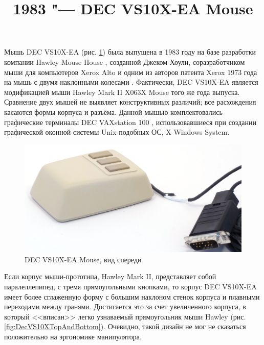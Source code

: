 \documentclass[11pt, a4paper]{article}
\begin{document}
\title{1983 "--- DEC VS10X-EA Mouse}
\date{}
\maketitle
{}
Мышь DEC VS10X-EA (рис. \ref{fig:DecVS10XPic}) была выпущена в 1983 году на базе разработки компании Hawley Mouse House \cite{hawley,mouses}, созданной Джеком Хоули, соразработчиком мыши для компьютеров Xerox Alto и одним из авторов патента Xerox 1973 года на мышь с двумя наклонными колесами \cite{pat}. Фактически, DEC VS10X-EA является модификацией мыши Hawley Mark II X063X Mouse того же года выпуска. Сравнение двух мышей не выявляет конструктивных различий; все расхождения касаются формы корпуса и разъёма. Данной мышью комплектовались графические терминалы DEC VAXstation 100 \cite{reddit}, использовавшиеся при создании графической оконной системы Unix-подобных ОС, X Windows System.

\begin{figure}[h]
   \centering
    \includegraphics[scale=0.6]{1983_dec_vs10x_ea_mouse/pic_30.jpg}
    \caption{DEC VS10X-EA Mouse, вид спереди}
    \label{fig:DecVS10XPic}
\end{figure}

Если корпус мыши-прототипа, Hawley Mark II, представляет собой паралеллепипед, с тремя прямоугольными кнопками, то корпус DEC VS10X-EA имеет более сглаженную форму с большим наклоном стенок корпуса и плавными переходами между гранями. Достигается это за счет увеличенного корпуса, в который <<вписан>> легко узнаваемый прямоугольник мыши Hawley (рис. \ref{fig:DecVS10XTopAndBottom}). Очевидно, такой дизайн не мог не сказаться положительно на эргономике манипулятора.
\end{document}
